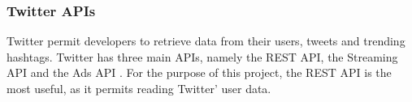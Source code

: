 % 
% 
% 
% 

\subsubsection{Twitter \acp{API}} \label{sub:twitterapi}
Twitter permit developers to retrieve data from their users, tweets and
trending hashtags. Twitter has three main \acp{API}, namely the \ac{REST} \ac{API}, the Streaming
\ac{API} and the Ads \ac{API} \citep{TwitterDevDocs}. For the purpose of this
project, the \ac{REST} \ac{API} is the most useful, as it permits reading
Twitter' user data.

